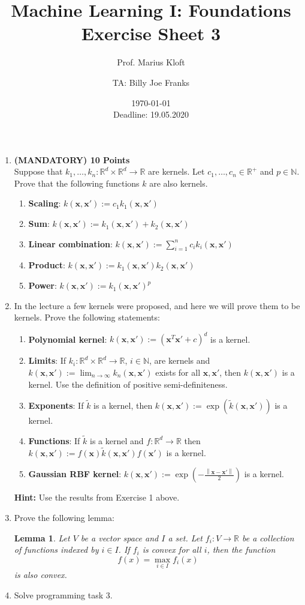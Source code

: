 \documentclass[]{scrartcl}
\author{Prof. Marius Kloft \and TA: Billy Joe Franks}
\title{Machine Learning I: Foundations \\ Exercise Sheet 3}
\date{\today\\Deadline: 19.05.2020}
\newcommand{\R}{\mathbb{R}}
\newcommand{\N}{\mathbb{N}}
\newcommand{\bx}{\mathbf{x}}
\newtheorem{lem}{Lemma}
\begin{document}
\maketitle

\begin{enumerate}

\item \textbf{(MANDATORY) 10 Points}\\ 
Suppose that $k_1,\ldots,k_n: \R^d \times \R^d \to \R$ are kernels. Let $c_1, \dots, c_n \in \R^+$ and $p \in \N$. Prove that the following functions $k$ are also kernels.
\begin{enumerate}
	\item \textbf{Scaling}: $k(\bx,\bx') := c_1 k_1(\bx,\bx')$
	\item\textbf{Sum}: $k(\bx,\bx') := k_1(\bx,\bx') + k_2(\bx,\bx')$
	\item\textbf{Linear combination}: $k(\bx,\bx') := \sum_{i=1}^n c_i k_i(\bx,\bx')$
	\item\textbf{Product}: $k(\bx,\bx') := k_1(\bx,\bx')k_2(\bx,\bx')$
	\item\textbf{Power}: $k(\bx,\bx') := k_1(\bx,\bx')^{p}$
\end{enumerate}

\item In the lecture a few kernels were proposed, and here we will prove them to be kernels. Prove the following statements:
\begin{enumerate}
	\item \textbf{Polynomial kernel}: $k(\bx, \bx'):=(\bx^T\bx'+c)^d$ is a kernel. 
  \item\textbf{Limits}: If $k_i: \R^d \times \R^d \to \R$, $i\in\N$, are kernels and $k(\bx,\bx'):=\lim_{n \to \infty}k_n(\bx, \bx')$ exists for all $\bx, \bx'$, then $k(\bx, \bx')$ is a kernel. Use the definition of positive semi-definiteness. 
	\item\textbf{Exponents}: If $\tilde{k}$ is a kernel, then $k(\bx,\bx') := \exp{(\tilde{k}(\bx,\bx'))}$ is a kernel.
	\item\textbf{Functions}: If $\tilde{k}$ is a kernel and $f:\R^d \to \R$ then $k(\bx,\bx') := f(\bx)\tilde{k}(\bx,\bx')f(\bx')$ is a kernel.
	\item\textbf{Gaussian RBF kernel}: $ k(\bx, \bx'):=\exp{(-\frac{\left\lVert\bx-\bx'\right\rVert}{2})}$ is a kernel.
\end{enumerate}
\textbf{Hint:} Use the results from Exercise 1 above.

\newpage
\item Prove the following lemma:
	\begin{lem}
		Let $V$ be a vector space and $I$ a set. Let $f_i:V \to \R$ be a collection of functions indexed by $i \in I$. If $f_i$ is convex for all $i$, then the function
		$$f(x) = \max_{i \in I} f_i(x)$$
		is also convex.
	\end{lem}
	
\item Solve programming task 3.
\end{enumerate}
\end{document}
